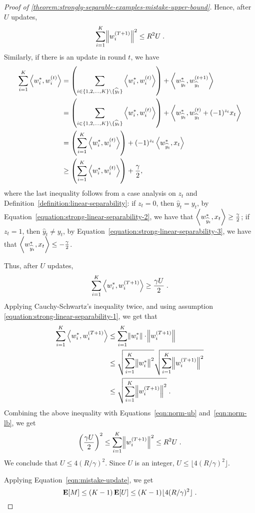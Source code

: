 \begin{proof}[Proof of \autoref{theorem:strongly-separable-examples-mistake-upper-bound}]
Hence, after $U$ updates,
\begin{equation}
\sum_{i=1}^K \norm{w_i^{(T+1)}}^2 \le R^2 U \; .
\label{eqn:norm-ub}
\end{equation}
Similarly, if there is an update in round $t$, we have
\begingroup
\allowdisplaybreaks
\begin{align*}
\sum_{i=1}^K \left\langle w_i^*, w_i^{(t)} \right\rangle
& = \left( \sum_{i \in \{1,2,\dots,K\} \setminus \{\widehat y_t\}} \left\langle w_i^*, w_i^{(t)} \right\rangle \right) + \left\langle w_{\widehat y_t}^*, w_{\widehat y_t}^{(t+1)} \right\rangle \\
& = \left( \sum_{i \in \{1,2,\dots,K\} \setminus \{\widehat y_t\}} \left\langle w_i^*, w_i^{(t)} \right\rangle \right) + \left\langle w_{\widehat y_t}^*, w_{\widehat y_t}^{(t)} + (-1)^{z_t} x_t \right\rangle \\
& = \left( \sum_{i=1}^K \left\langle w_i^*, w_i^{(t)} \right\rangle \right) + (-1)^{z_t} \left\langle w_{\widehat y_t}^*, x_t \right\rangle \\
& \ge \left( \sum_{i=1}^K \left\langle w_i^*, w_i^{(t)} \right\rangle \right) + \frac \gamma 2,
\end{align*}
\endgroup
where the last inequality follows from a case analysis on $z_t$ and
Definition~\ref{definition:linear-separability}: if $z_t = 0$, then
$\widehat y_t = y_t$, by Equation~\eqref{equation:strong-linear-separability-2},
we have that $\left\langle w_{\widehat y_t}^*, x_t \right\rangle \geq \frac \gamma 2$; if $z_t = 1$,
then $\widehat y_t \neq y_t$, by
Equation~\eqref{equation:strong-linear-separability-3}, we have that
$\left\langle w_{\widehat y_t}^*, x_t \right\rangle \le -\frac \gamma 2$.

Thus, after $U$ updates,
\begin{equation}
\sum_{i=1}^K \left\langle w_i^*, w_i^{(T+1)} \right\rangle \ge \frac {\gamma U} 2 \; .
\label{eqn:norm-lb}
\end{equation}
Applying Cauchy-Schwartz's inequality twice, and using assumption
\eqref{equation:strong-linear-separability-1}, we get that
\begin{align*}
\sum_{i=1}^K \left\langle w_i^*, w_i^{(T+1)} \right\rangle
& \le \sum_{i=1}^K \norm{w_i^*} \cdot \norm{w_i^{(T+1)}} \\
& \le \sqrt{\sum_{i=1}^K \norm{w_i^*}^2} \sqrt{\sum_{i=1}^K \norm{w_i^{(T+1)}}^2} \\
& \le \sqrt{\sum_{i=1}^K \norm{w_i^{(T+1)}}^2} \; .
\end{align*}
Combining the above inequality with Equations~\eqref{eqn:norm-ub} and~\eqref{eqn:norm-lb}, we get
$$
\left(\frac{\gamma U}{2} \right)^2 \le \sum_{i=1}^K \norm{w_i^{(T+1)}}^2 \le R^2 U \; .
$$
We conclude that $U \le 4(R/\gamma)^2$. Since $U$ is an integer, $U \le \lfloor 4(R/\gamma)^2 \rfloor$.

Applying Equation~\eqref{eqn:mistake-update}, we get
$$
\operatorname*{\mathbf{E}}[M] \leq (K-1) \operatorname*{\mathbf{E}}[U] \leq (K-1) \lfloor 4(R/\gamma)^2 \rfloor \; . \qedhere
$$
\end{proof}





